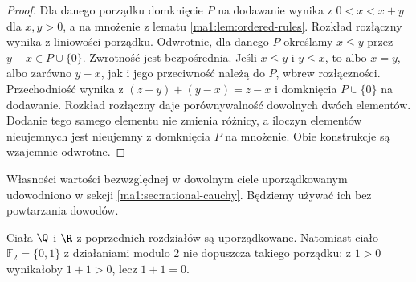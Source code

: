 \begin{proof}
Dla danego porządku domknięcie $P$ na dodawanie wynika z $0<x<x+y$ dla $x,y>0$, a na mnożenie z lematu \ref{ma1:lem:ordered-rules}. Rozkład rozłączny wynika z liniowości porządku.
Odwrotnie, dla danego $P$ określamy $x\le y$ przez $y-x\in P\cup\{0\}$. Zwrotność jest bezpośrednia. Jeśli $x\le y$ i $y\le x$, to albo $x=y$, albo zarówno $y-x$, jak i jego przeciwność należą do $P$, wbrew rozłączności. Przechodniość wynika z $(z-y)+(y-x)=z-x$ i domknięcia $P\cup\{0\}$ na dodawanie. Rozkład rozłączny daje porównywalność dowolnych dwóch elementów. Dodanie tego samego elementu nie zmienia różnicy, a iloczyn elementów nieujemnych jest nieujemny z domknięcia $P$ na mnożenie. Obie konstrukcje są wzajemnie odwrotne.
\end{proof}
Własności wartości bezwzględnej w dowolnym ciele uporządkowanym udowodniono w sekcji \ref{ma1:sec:rational-cauchy}. Będziemy używać ich bez powtarzania dowodów.
\begin{przyklad}
Ciała $\Q$ i $\R$ z poprzednich rozdziałów są uporządkowane. Natomiast ciało $\mathbb F_2=\{0,1\}$ z działaniami modulo $2$ nie dopuszcza takiego porządku: z $1>0$ wynikałoby $1+1>0$, lecz $1+1=0$.
\end{przyklad}

